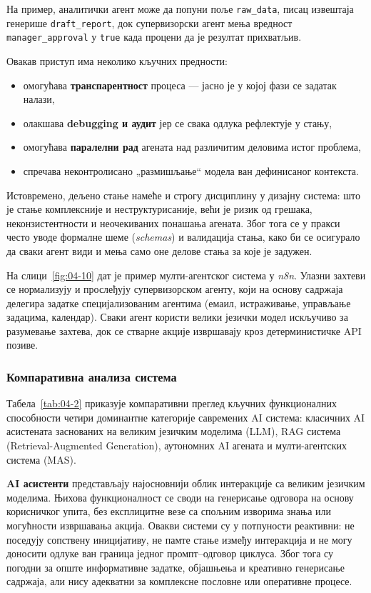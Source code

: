 На пример, аналитички агент може да попуни поље \texttt{raw\_data},
писац извештаја генерише \texttt{draft\_report},
док супервизорски агент мења вредност \texttt{manager\_approval} у \texttt{true}
када процени да је резултат прихватљив.

Овакав приступ има неколико кључних предности:
\begin{itemize}
    \item омогућава \textbf{транспарентност} процеса — јасно је у којој фази се задатак налази,
    \item олакшава \textbf{debugging и аудит} јер се свака одлука рефлектује у стању,
    \item омогућава \textbf{паралелни рад} агената над различитим деловима истог проблема,
    \item спречава неконтролисано „размишљање“ модела ван дефинисаног контекста.
\end{itemize}

Истовремено, дељено стање намеће и строгу дисциплину у дизајну система:
што је стање комплексније и неструктурисаније, већи је ризик од грешака,
неконзистентности и неочекиваних понашања агената.
Због тога се у пракси често уводе формалне шеме (\textit{schemas}) и валидација стања,
како би се осигурало да сваки агент види и мења само оне делове стања за које је задужен. 

На слици~\ref{fig:04-10} дат је пример мулти-агентског система у \textit{n8n}. Улазни захтеви се нормализују и прослеђују супервизорском агенту, који на основу садржаја
делегира задатке специјализованим агентима (емаил, истраживање, управљање задацима, календар).
Сваки агент користи велики језички модел искључиво за разумевање захтева, док се стварне
акције извршавају кроз детерминистичке API позиве.

\subsubsection{Компаративна анализа система}

Табела~\ref{tab:04-2} приказује компаративни преглед кључних функционалних способности четири доминантне категорије савремених AI система: класичних AI асистената заснованих на великим језичким моделима (LLM), RAG система (Retrieval-Augmented Generation), аутономних AI агената и мулти-агентских система (MAS).

\textbf{AI асистенти} представљају најосновнији облик интеракције са великим језичким моделима. Њихова функционалност се своди на генерисање одговора на основу корисничког упита, без експлицитне везе са спољним изворима знања или могућности извршавања акција. Овакви системи су у потпуности реактивни: не поседују сопствену иницијативу, не памте стање између интеракција и не могу доносити одлуке ван граница једног промпт–одговор циклуса. Због тога су погодни за опште информативне задатке, објашњења и креативно генерисање садржаја, али нису адекватни за комплексне пословне или оперативне процесе.

